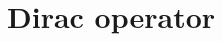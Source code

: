 \documentclass{article}
\theoremstyle{plain} %
\theoremstyle{convention} %
\theoremstyle{remark} %
\numberwithin{equation}{section}
\begin{document}

\section{Dirac operator}

\label{sec:dop}

\end{document}

